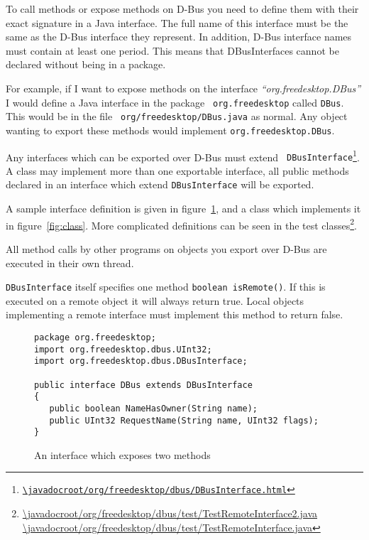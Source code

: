 \documentclass[a4paper,12pt]{article}
\begin{document}
To call methods or expose methods on D-Bus you need to define them with their
exact signature in a Java interface. The full name of this interface must be
the same as the D-Bus interface they represent. In addition, D-Bus interface
names must contain at least one period. This means that DBusInterfaces cannot
be declared without being in a package. 

For example, if I want to expose methods on the interface {\em
``org.freedesktop.DBus''} I would define a Java interface in the package {\tt
org.freedesktop} called {\tt DBus}. This would be in the file {\tt
org/freedesktop/DBus.java} as normal. Any object wanting to export these
methods would implement {\tt org.freedesktop.DBus}.

Any interfaces which can be exported over D-Bus must extend {\tt
DBusInterface\footnote{\url{\javadocroot/org/freedesktop/dbus/DBusInterface.html}}}.
A class may implement more than one exportable interface, all public methods
declared in an interface which extend {\tt DBusInterface} will be exported.

A sample interface definition is given in figure~\ref{fig:interface}, and a
class which implements it in figure~\ref{fig:class}. More complicated
definitions can be seen in the test
classes\footnote{\url{\javadocroot/org/freedesktop/dbus/test/TestRemoteInterface2.java}
\url{\javadocroot/org/freedesktop/dbus/test/TestRemoteInterface.java}}.

All method calls by other programs on objects you export over D-Bus
are executed in their own thread.

{\tt DBusInterface} itself specifies one method \verb&boolean isRemote()&. If
this is executed on a remote object it will always return true. Local objects
implementing a remote interface must implement this method to return false.

\begin{figure}[htb]
\begin{center}
\begin{verbatim}
package org.freedesktop;
import org.freedesktop.dbus.UInt32;
import org.freedesktop.dbus.DBusInterface;

public interface DBus extends DBusInterface
{
   public boolean NameHasOwner(String name);
   public UInt32 RequestName(String name, UInt32 flags);
}
\end{verbatim}
\end{center}
\caption{An interface which exposes two methods}
\label{fig:interface}
\end{figure}
\end{document}
